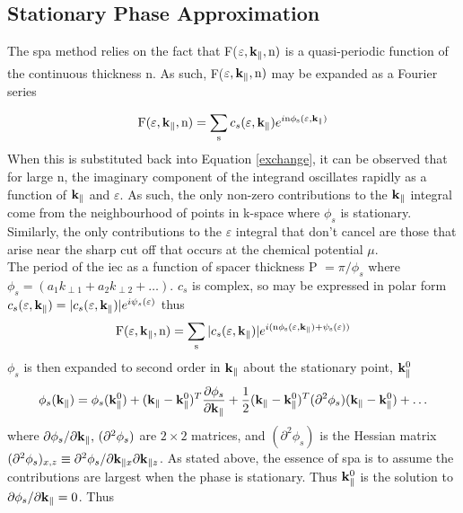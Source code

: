\documentclass[a4paper, 12pt]{article}
\newcommand{\site}[1]{\textsuperscript{\textcolor{blue}{\cite{#1}}}}
\begin{document}
	\subsection{Stationary Phase Approximation}
	The \gls{spa} method relies on the fact that F($\varepsilon, \rm \bf k_\parallel, \rm n)$ is a quasi-periodic function of the continuous thickness n\site{rev3}. As such, F($\varepsilon, \rm \bf k_\parallel, \rm n)$ may be expanded as a Fourier series

\begin{equation}
	\rm F(\varepsilon, \bf k_\parallel, \rm n) = \sum_s \mathnormal{c_s(\varepsilon, {\bf k}_\parallel) e^{i\rm n \phi_s(\varepsilon, \bf k_\parallel)}}
\end{equation}
When this is substituted back into Equation \eqref{exchange}, it can be observed that for large n, the imaginary component of the integrand oscillates rapidly as a function of $\rm \bf k_\parallel$ and $\varepsilon$. As such, the only non-zero contributions to the $\rm \bf k_\parallel$ integral come from the neighbourhood of points in k-space where $\phi_s$ is stationary. Similarly, the only contributions to the $\varepsilon$ integral that don't cancel are those that arise near the sharp cut off that occurs at the chemical potential $\mu$.
\\[3mm]
The period of the \gls{iec} as a function of spacer thickness P $= \pi/\phi_s$ where $\phi_s = (a_1k_{\perp 1} + a_2k_{\perp 2} + \dots)$.
$c_s$ is complex, so may be expressed in polar form $c_s(\varepsilon, {\bf k_\parallel)} = |c_s(\varepsilon,{\bf k_\parallel)}|e^{i \psi_s (\varepsilon)}$ thus
\begin{equation}
	\rm F(\varepsilon, \bf k_\parallel, \rm n) = \sum_s \mathnormal{|c_s(\varepsilon, {\bf k_\parallel)}| e^{i\rm (n \phi_s(\varepsilon, {\bf k_\parallel})+ \psi_s(\varepsilon))}}
\end{equation}
$\phi_s$ is then expanded to second order in $\bf k_\parallel$ about the stationary point, ${\bf k}_\parallel^0$
\begin{multline}
	\phi_s({\bf k_\parallel}) = \phi_s({\bf k}_\parallel^0) + ({\bf k}_\parallel - {\bf k}_\parallel^0)^T\frac{\partial \phi_s}{\partial{\bf k}_\parallel }+ \frac{1}{2}({\bf k}_\parallel - {\bf k}_\parallel^0)^T(\partial^2\phi_s) ({\bf k}_\parallel - {\bf k}_\parallel^0) + \dots
\end{multline}
where $\partial \phi_s/\partial{\bf k}_\parallel,\,(\partial^2\phi_s)$ are $2\times2$ matrices, and $(\partial^2 \phi_s)$ is the Hessian matrix $(\partial^2\phi_s)_{x, z} \equiv \partial^2\phi_s/\partial{\rm \bf k_{\parallel \mathnormal x}}\partial{\rm \bf k_{\parallel \mathnormal z}}$. As stated above, the essence of \gls{spa} is to assume the contributions are largest when the phase is stationary. Thus ${\bf k}_\parallel^0$ is the solution to ${\partial \phi_s}/{\partial{\bf k}_\parallel } = 0$. Thus
\end{document}
